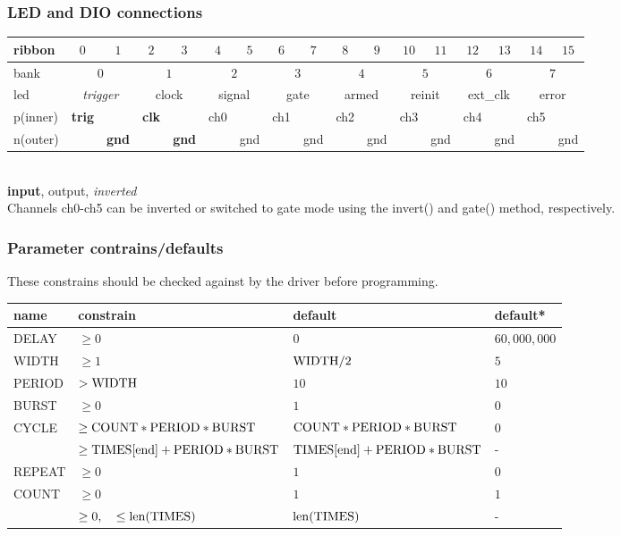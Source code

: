 \documentclass{article}
\begin{document}
\subsubsection*{LED and DIO connections}
	\begin{tabular}[t]{l||cc|cc|cc|cc|cc|cc|cc|cc}
		ribbon & {\color{red}$0$} & $1$  & $2$  & $3$  & $4$  & $5$ & $6$ & $7$ & $8$  & $9$  & $10$  & $11$  & $12$ & $13$ & $14$ & $15$ \\\hline
		bank &\multicolumn{2}{c|}{$0$}  & \multicolumn{2}{c|}{$1$}  & \multicolumn{2}{c|}{$2$}  & \multicolumn{2}{c|}{$3$}  & \multicolumn{2}{c|}{$4$}  & \multicolumn{2}{c|}{$5$} & \multicolumn{2}{c|}{$6$} & \multicolumn{2}{c}{$7$} \\\hline
		led  & \multicolumn{2}{c|}{\textit{trigger}}  & \multicolumn{2}{c|}{clock}  & \multicolumn{2}{c|}{signal}  & \multicolumn{2}{c|}{gate}  & \multicolumn{2}{c|}{armed}  & \multicolumn{2}{c|}{reinit} & \multicolumn{2}{c|}{ext\_clk} & \multicolumn{2}{c}{error} \\\hline
		p(inner) & \textbf{trig} && \textbf{clk} && ch0 && ch1 && ch2 && ch3 && ch4 && ch5 \\\hline
		n(outer) && \textbf{gnd} && \textbf{gnd} && gnd && gnd && gnd && gnd && gnd && gnd  \\
	\end{tabular}	\\\textbf{input}, output, \textit{inverted}\\

Channels ch0-ch5 can be inverted or switched to gate mode using the invert() and gate() method, respectively. 

\subsubsection*{Parameter contrains/defaults}
These constrains should be checked against by the driver before programming.\\
\begin{tabular}{llll}
name  &constrain&default&default*\\\hline
DELAY &$\geq0$&$0$&$60,000,000$\\
WIDTH &$\geq1$&$\rm{WIDTH}/2$&$5$\\
PERIOD&$>\rm{WIDTH}$&$10$&$10$\\
BURST&$\geq0$&$1$&$0$\\
CYCLE &$\geq\rm{COUNT}*\rm{PERIOD}*\rm{BURST}$&$\rm{COUNT}*\rm{PERIOD}*\rm{BURST}$&$0$\\
&$\geq\rm{TIMES[end]}+\rm{PERIOD}*\rm{BURST}$&$\rm{TIMES[end]}+\rm{PERIOD}*\rm{BURST}$&-\\
REPEAT&$\geq0$&$1$&$0$\\
COUNT &$\geq0$&$1$&$1$\\
 &$\geq0,\quad \leq \rm{len}(\rm{TIMES})$&$\rm{len}(\rm{TIMES})$&-\\
\end{tabular}
\end{document}
